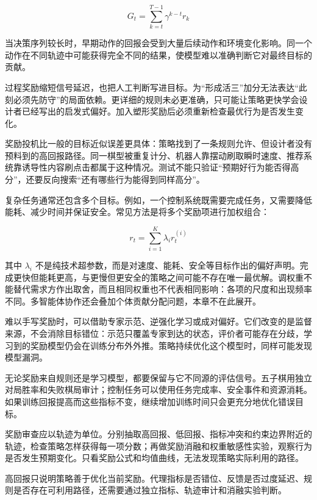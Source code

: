 \begin{equation}
G_t
=
\sum_{k=t}^{T-1}
\gamma^{k-t}r_k
\end{equation}

当决策序列较长时，早期动作的回报会受到大量后续动作和环境变化影响。同一个动作在不同轨迹中可能获得完全不同的结果，使模型难以准确判断它对最终目标的贡献。


过程奖励缩短信号延迟，也把人工判断写进目标。为“形成活三”加分无法表达“此刻必须先防守”的局面依赖。更详细的规则未必更准确，只可能让策略更快学会设计者已经写出的启发式偏好。加入塑形奖励后必须重新检查最优行为是否发生变化。

奖励投机比一般的目标近似误差更具体：策略找到了一条规则允许、但设计者没有预料到的高回报路径。同一棋型被重复计分、机器人靠摆动刷取瞬时速度、推荐系统靠诱导性内容刷点击都属于这种情况。测试不能只验证“预期好行为能否得高分”，还要反向搜索“还有哪些行为能得到同样高分”。

复杂任务通常还包含多个目标。例如，一个控制系统既需要完成任务，又需要降低能耗、减少时间并保证安全。常见方法是将多个奖励项进行加权组合：

\begin{equation}
r_t
=
\sum_{i=1}^{K}
\lambda_i r_t^{(i)}
\end{equation}

其中 $\lambda_i$ 不是纯技术超参数，而是对速度、能耗、安全等目标作出的偏好声明。完成更快但能耗更高，与更慢但更安全的策略之间可能不存在唯一最优解。调权重不能替代需求方作出取舍，而且相同权重也不代表相同影响：各项的尺度和出现频率不同。多智能体协作还会叠加个体贡献分配问题，本章不在此展开。

难以手写奖励时，可以借助专家示范、逆强化学习或成对偏好。它们改变的是监督来源，不会消除目标错位：示范只覆盖专家到达的状态，评价者可能存在分歧，学习到的奖励模型仍会在训练分布外外推。策略持续优化这个模型时，同样可能发现模型漏洞。

无论奖励来自规则还是学习模型，都要保留与它不同源的评估信号。五子棋用独立对局胜率和失败棋局审计；控制任务可以使用任务完成率、安全事件和资源消耗。如果训练回报提高而这些指标不变，继续增加训练时间只会更充分地优化错误目标。

奖励审查应以轨迹为单位。分别抽取高回报、低回报、指标冲突和约束边界附近的轨迹，检查策略怎样获得每一项分数；再做奖励消融和权重敏感性实验，观察行为是否发生预期变化。只看奖励公式和均值曲线，无法发现策略实际利用的路径。

高回报只说明策略善于优化当前奖励。代理指标是否错位、反馈是否过度延迟、规则是否存在可利用路径，还需要通过独立指标、轨迹审计和消融实验判断。


